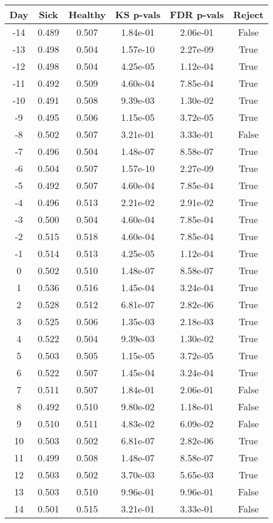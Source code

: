 \begin{tabular}{c|c|c|c|c|c}
Day &  Sick & Healthy &  KS p-vals & FDR p-vals & Reject\\
\hline
-14 & 0.489 &   0.507 &   1.84e-01 &   2.06e-01 &  False\\
-13 & 0.498 &   0.504 &   1.57e-10 &   2.27e-09 &   True\\
-12 & 0.498 &   0.504 &   4.25e-05 &   1.12e-04 &   True\\
-11 & 0.492 &   0.509 &   4.60e-04 &   7.85e-04 &   True\\
-10 & 0.491 &   0.508 &   9.39e-03 &   1.30e-02 &   True\\
 -9 & 0.495 &   0.506 &   1.15e-05 &   3.72e-05 &   True\\
 -8 & 0.502 &   0.507 &   3.21e-01 &   3.33e-01 &  False\\
 -7 & 0.496 &   0.504 &   1.48e-07 &   8.58e-07 &   True\\
 -6 & 0.504 &   0.507 &   1.57e-10 &   2.27e-09 &   True\\
 -5 & 0.492 &   0.507 &   4.60e-04 &   7.85e-04 &   True\\
 -4 & 0.496 &   0.513 &   2.21e-02 &   2.91e-02 &   True\\
 -3 & 0.500 &   0.504 &   4.60e-04 &   7.85e-04 &   True\\
 -2 & 0.515 &   0.518 &   4.60e-04 &   7.85e-04 &   True\\
 -1 & 0.514 &   0.513 &   4.25e-05 &   1.12e-04 &   True\\
  0 & 0.502 &   0.510 &   1.48e-07 &   8.58e-07 &   True\\
  1 & 0.536 &   0.516 &   1.45e-04 &   3.24e-04 &   True\\
  2 & 0.528 &   0.512 &   6.81e-07 &   2.82e-06 &   True\\
  3 & 0.525 &   0.506 &   1.35e-03 &   2.18e-03 &   True\\
  4 & 0.522 &   0.504 &   9.39e-03 &   1.30e-02 &   True\\
  5 & 0.503 &   0.505 &   1.15e-05 &   3.72e-05 &   True\\
  6 & 0.522 &   0.507 &   1.45e-04 &   3.24e-04 &   True\\
  7 & 0.511 &   0.507 &   1.84e-01 &   2.06e-01 &  False\\
  8 & 0.492 &   0.510 &   9.80e-02 &   1.18e-01 &  False\\
  9 & 0.510 &   0.511 &   4.83e-02 &   6.09e-02 &  False\\
 10 & 0.503 &   0.502 &   6.81e-07 &   2.82e-06 &   True\\
 11 & 0.499 &   0.508 &   1.48e-07 &   8.58e-07 &   True\\
 12 & 0.503 &   0.502 &   3.70e-03 &   5.65e-03 &   True\\
 13 & 0.503 &   0.510 &   9.96e-01 &   9.96e-01 &  False\\
 14 & 0.501 &   0.515 &   3.21e-01 &   3.33e-01 &  False\\
\end{tabular}
